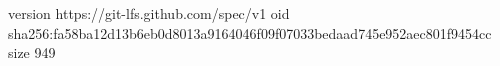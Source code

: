 version https://git-lfs.github.com/spec/v1
oid sha256:fa58ba12d13b6eb0d8013a9164046f09f07033bedaad745e952aec801f9454cc
size 949
